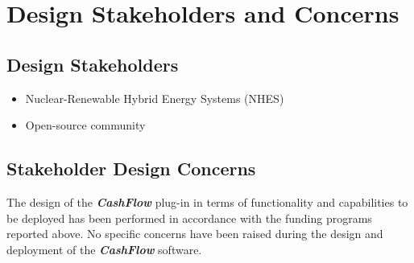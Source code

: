 \section{Design Stakeholders and Concerns}
\subsection{Design Stakeholders}
\begin{itemize}
  \item Nuclear-Renewable Hybrid Energy Systems (NHES)
  \item Open-source community 
\end{itemize}
\subsection{Stakeholder Design Concerns}
The design of the \textbf{\textit{CashFlow}} plug-in in terms of functionality and capabilities to be deployed has been performed in 
accordance with the funding programs reported above. No specific concerns have been raised during the design and 
deployment of the \textbf{\textit{CashFlow}} software. 
